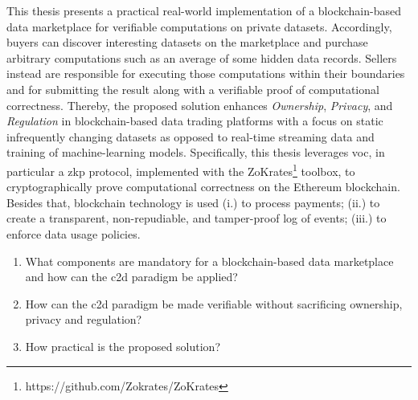 

This thesis presents a practical real-world implementation of a blockchain-based data marketplace for verifiable computations on private datasets. Accordingly, buyers can discover interesting datasets on the marketplace and purchase arbitrary computations such as an average of some hidden data records. Sellers instead are responsible for executing those computations within their boundaries and for submitting the result along with a verifiable proof of computational correctness. Thereby, the proposed solution enhances \emph{Ownership}, \emph{Privacy}, and \emph{Regulation} in blockchain-based data trading platforms with a focus on static infrequently changing datasets as opposed to real-time streaming data and training of machine-learning models. Specifically, this thesis leverages \acrshort{voc}, in particular a \acrfull{zkp} protocol, implemented with the ZoKrates\footnote{https://github.com/Zokrates/ZoKrates} toolbox, to cryptographically prove computational correctness on the Ethereum blockchain. Besides that, blockchain technology is used (i.) to process payments; (ii.) to create a transparent, non-repudiable, and tamper-proof log of events; (iii.) to enforce data usage policies.  

\begin{enumerate}
    \item What components are mandatory for a blockchain-based data marketplace and how can the \acrlong{c2d} paradigm be applied?
    \item How can the \acrlong{c2d} paradigm be made verifiable without sacrificing ownership, privacy and regulation?
    \item How practical is the proposed solution?
\end{enumerate}

